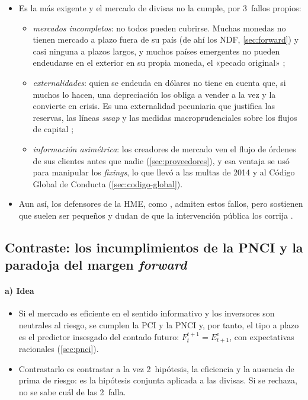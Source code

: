 \documentclass[11pt]{article}
\begin{document}
\begin{itemize}
\item Es la más exigente y el mercado de divisas no la cumple, por 3~fallos propios:
  \begin{itemize}
  \item \emph{mercados incompletos}: no todos pueden cubrirse. Muchas monedas no tienen mercado a plazo fuera de su país (de ahí los NDF, \ref{sec:forward}) y casi ninguna a plazos largos, y muchos países emergentes no pueden endeudarse en el exterior en su propia moneda, el «pecado original»\nocite{EichengreenHausmann1999} ;
  \item \emph{externalidades}: quien se endeuda en dólares no tiene en cuenta que, si muchos lo hacen, una depreciación los obliga a vender a la vez y la convierte en crisis. Es una externalidad pecuniaria que justifica las reservas, las líneas \emph{swap} y las medidas macroprudenciales sobre los flujos de capital\nocite{Korinek2011New}  ;
  \item \emph{información asimétrica}: los creadores de mercado ven el flujo de órdenes de sus clientes antes que nadie (\ref{sec:proveedores}), y esa ventaja se usó para manipular los \emph{fixings}, lo que llevó a las multas de 2014 y al Código Global de Conducta (\ref{sec:codigo-global}).
  \end{itemize}
\item Aun así, los defensores de la HME, como , admiten estos fallos, pero sostienen que suelen ser pequeños y dudan de que la intervención pública los corrija\nocite{Cochrane2011Krugman} .
\end{itemize}

\subsection{Contraste: los incumplimientos de la PNCI y la paradoja del margen \emph{forward}}\label{sec:paradoja}

\paragraph{a) Idea}

\begin{itemize}
\item Si el mercado es eficiente en el sentido informativo y los inversores son neutrales al riesgo, se cumplen la PCI y la PNCI y, por tanto, el tipo a plazo es el predictor insesgado del contado futuro: $F_t^{t+1}=E^e_{t+1}$, con expectativas racionales (\ref{sec:pnci}).
\item Contrastarlo es contrastar a la vez 2~hipótesis, la eficiencia y la ausencia de prima de riesgo: es la hipótesis conjunta aplicada a las divisas. Si se rechaza, no se sabe cuál de las 2~falla.
\end{itemize}
\end{document}
